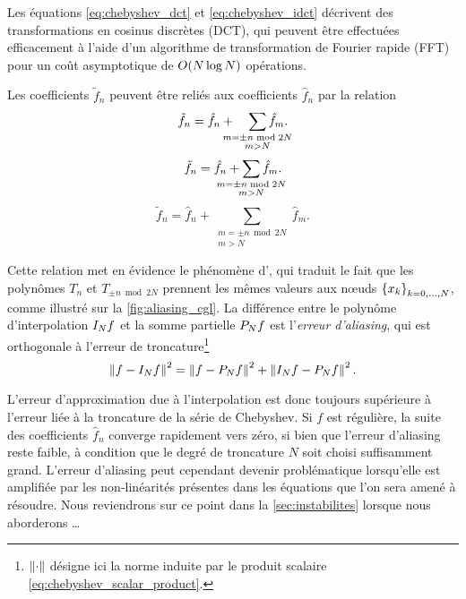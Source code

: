 Les équations \eqref{eq:chebyshev_dct} et \eqref{eq:chebyshev_idct} décrivent des transformations en cosinus discrètes (DCT), qui peuvent être effectuées efficacement à l'aide d'un algorithme de transformation de Fourier rapide (FFT) pour un coût asymptotique de $\bigO{N \log N}$ opérations.
\par
Les coefficients $\tilde{f}_n$ peuvent être reliés aux coefficients $\hat{f}_n$ par la relation
\begin{equation}
	\tilde{f}_n = \hat{f}_n + 
	\quad\sum_{\mathclap{\substack{m = \pm n \bmod{2N} \\ m > N}}} \hat{f}_m.
	\label{eq:chebyshev_aliasing}
\end{equation}
\begin{equation}
	\tilde{f}_n = \hat{f}_n + 
	\sum_{\mathclap{\substack{m = \pm n \bmod{2N} \\ m > N}}} \hat{f}_m.
\end{equation}
\begin{equation}
	\tilde{f}_n = \hat{f}_n + 
	\sum_{\substack{m = \pm n \bmod{2N} \\ m > N}} \hat{f}_m.
\end{equation}

Cette relation met en évidence le phénomène d', qui traduit le fait que les polynômes $T_n$ et $T_{\pm n \bmod{2N}}$ prennent les mêmes valeurs aux n\oe uds $\family{x}{k}{0}{N}$, comme illustré sur la \autoref{fig:aliasing_cgl}.
La différence entre le polynôme d'interpolation $\interpolant{f}{N}$ et la somme partielle $\truncseries{f}{N}$ est l'\textit{erreur d'aliasing}, qui est orthogonale à l'erreur de troncature\footnote{$\normtwo{\cdot}$ désigne ici la norme induite par le produit scalaire \eqref{eq:chebyshev_scalar_product}.}
\begin{equation}
	\normtwo{f - \interpolant{f}{N}}^2 = 
	\normtwo{f - \truncseries{f}{N}}^2 + 
	\normtwo{\interpolant{f}{N} - \truncseries{f}{N}}^2.
	\label{eq:chebyshev_aliasin_esrror}
\end{equation}

L'erreur d'approximation due à l'interpolation est donc toujours supérieure à l'erreur liée à la troncature de la série de Chebyshev.
Si $f$ est régulière, la suite des coefficients $\hat{f}_n$ converge rapidement vers zéro, si bien que l'erreur d'aliasing reste faible, à condition que le degré de troncature $N$ soit choisi suffisamment grand.
L'erreur d'aliasing peut cependant devenir problématique lorsqu'elle est amplifiée par les non-linéarités présentes dans les équations que l'on sera amené à résoudre. 
Nous reviendrons sur ce point dans la \autoref{sec:instabilites} lorsque nous aborderons \ldots


